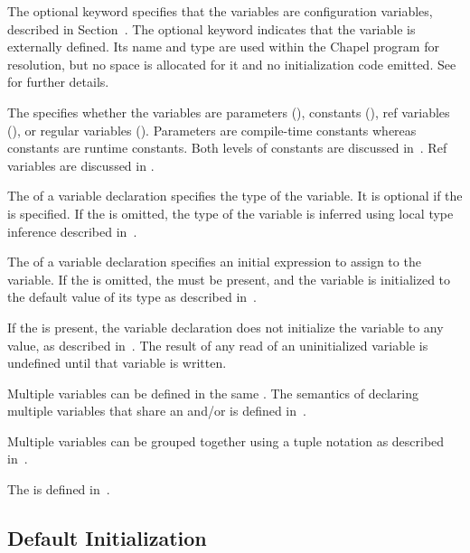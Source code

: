 The optional keyword  specifies that the variables are
configuration variables, described in
Section~.  The optional keyword 
indicates that the variable is externally defined.  Its name and type are used
within the Chapel program for resolution, but no space is allocated for it and
no initialization code emitted.
See  for further details.

The  specifies whether the variables are
parameters (), constants (),
ref variables (), or regular
variables ().  Parameters are compile-time constants whereas
constants are runtime constants.  Both levels of constants are
discussed in~.
Ref variables are discussed in .

The  of a variable declaration specifies the type of
the variable.  It is optional if the  is
specified.  If the  is omitted, the type of the
variable is inferred using local type inference described
in~.

The  of a variable declaration specifies an
initial expression to assign to the variable.  If
the  is omitted, the  must
be present, and the variable is initialized to the default value of
its type as described in~.

If the  is present, the variable
declaration does not initialize the variable to any value, as
described in~. The result of any read of an
uninitialized variable is undefined until that variable is written.

Multiple variables can be defined in the
same .  The semantics of declaring
multiple variables that share an 
and/or  is defined in~.

Multiple variables can be grouped together using a tuple notation as
described in~.

The  is defined
in~.

\subsection{Default Initialization}
\label{Default_Values_For_Types}

